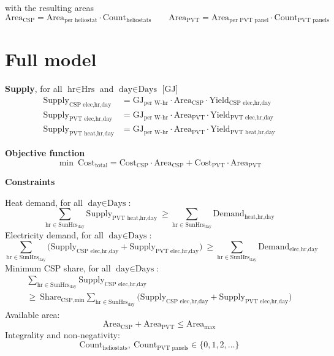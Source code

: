 \documentclass[11pt,a4paper]{article}
\newcommand{\T}[1]{\text{#1}}
\begin{document}
\vspace{4pt}with the resulting areas
\[
\T{Area}_{\T{CSP}}=\T{Area}_{\T{per heliostat}}\cdot\T{Count}_{\T{heliostats}}
\qquad
\T{Area}_{\T{PVT}}=\T{Area}_{\T{per PVT panel}}\cdot\T{Count}_{\T{PVT panels}}
\]

\section{Full model}
\textbf{Supply}, for all $\T{hr}\in\T{Hrs}$ and $\T{day}\in\T{Days}$ [GJ]
\begin{align*}
\T{Supply}_{\T{CSP elec,hr,day}} &= \T{GJ}_{\T{per W-hr}}\cdot\T{Area}_{\T{CSP}}\cdot\T{Yield}_{\T{CSP elec,hr,day}}\\
\T{Supply}_{\T{PVT elec,hr,day}} &= \T{GJ}_{\T{per W-hr}}\cdot\T{Area}_{\T{PVT}}\cdot\T{Yield}_{\T{PVT elec,hr,day}}\\
\T{Supply}_{\T{PVT heat,hr,day}} &= \T{GJ}_{\T{per W-hr}}\cdot\T{Area}_{\T{PVT}}\cdot\T{Yield}_{\T{PVT heat,hr,day}}
\end{align*}

\textbf{Objective function}
\[
\min\ \T{Cost}_{\T{total}}=\T{Cost}_{\T{CSP}}\cdot\T{Area}_{\T{CSP}}+\T{Cost}_{\T{PVT}}\cdot\T{Area}_{\T{PVT}}
\]

\textbf{Constraints}

Heat demand, for all $\T{day}\in\T{Days}$:
\begin{equation}\tag{C1}
\sum_{\T{hr}\in\T{SunHrs}_{\T{day}}}\T{Supply}_{\T{PVT heat,hr,day}}\ \ge\sum_{\T{hr}\in\T{SunHrs}_{\T{day}}}\T{Demand}_{\T{heat,hr,day}}
\end{equation}
Electricity demand, for all $\T{day}\in\T{Days}$:
\begin{equation}\tag{C2}
\sum_{\T{hr}\in\T{SunHrs}_{\T{day}}}\big(\T{Supply}_{\T{CSP elec,hr,day}}+\T{Supply}_{\T{PVT elec,hr,day}}\big)\ \ge\sum_{\T{hr}\in\T{SunHrs}_{\T{day}}}\T{Demand}_{\T{elec,hr,day}}
\end{equation}
Minimum CSP share, for all $\T{day}\in\T{Days}$:
\begin{multline}\tag{C3}
\sum_{\T{hr}\in\T{SunHrs}_{\T{day}}}\T{Supply}_{\T{CSP elec,hr,day}}\\
\ge\ \T{Share}_{\T{CSP,min}}\sum_{\T{hr}\in\T{SunHrs}_{\T{day}}}\big(\T{Supply}_{\T{CSP elec,hr,day}}+\T{Supply}_{\T{PVT elec,hr,day}}\big)
\end{multline}
Available area:
\begin{equation}\tag{C4}
\T{Area}_{\T{CSP}}+\T{Area}_{\T{PVT}}\le\T{Area}_{\T{max}}
\end{equation}
Integrality and non-negativity:
\begin{equation}\tag{C5}
\T{Count}_{\T{heliostats}},\ \T{Count}_{\T{PVT panels}}\in\{0,1,2,\dots\}
\end{equation}
\end{document}
